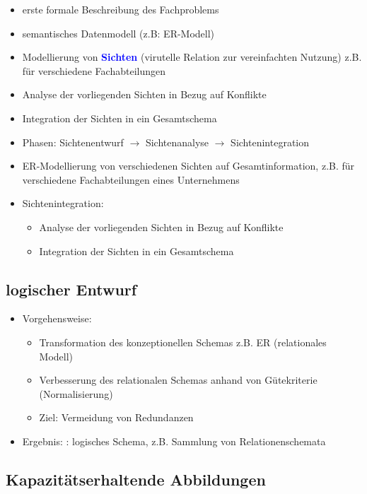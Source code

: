 \documentclass{scrartcl}
\newcommand{\key}[1]{{\textcolor{blue}{\textbf{#1}}}}
\begin{document}
\begin{itemize}
	\itemsep0em
	\item erste formale Beschreibung des Fachproblems
	\item semantisches Datenmodell (z.B: ER-Modell)
	\item Modellierung von \key{Sichten} (virutelle Relation zur vereinfachten Nutzung) z.B. für verschiedene Fachabteilungen
	\item Analyse der vorliegenden Sichten in Bezug auf Konflikte
	\item Integration der Sichten in ein Gesamtschema
	\item Phasen: Sichtenentwurf $\rightarrow$ Sichtenanalyse $\rightarrow$ Sichtenintegration
	\item ER-Modellierung von verschiedenen Sichten auf Gesamtinformation, z.B. für verschiedene Fachabteilungen eines Unternehmens
	\item Sichtenintegration:
	\begin{itemize}
		\item Analyse der vorliegenden Sichten in Bezug auf Konflikte
		\item Integration der Sichten in ein Gesamtschema
	\end{itemize}
\end{itemize}

\subsection{logischer Entwurf}

\begin{itemize}
	\itemsep0em
	\item Vorgehensweise:
	\begin{itemize}
		\item Transformation des konzeptionellen Schemas z.B. ER (relationales Modell)
		\item Verbesserung des relationalen Schemas anhand von Gütekriterie (Normalisierung)
		\item Ziel: Vermeidung von Redundanzen
	\end{itemize}
	\item Ergebnis: : logisches Schema, z.B. Sammlung von Relationenschemata
\end{itemize}

\subsection{Kapazitätserhaltende Abbildungen}
\end{document}
